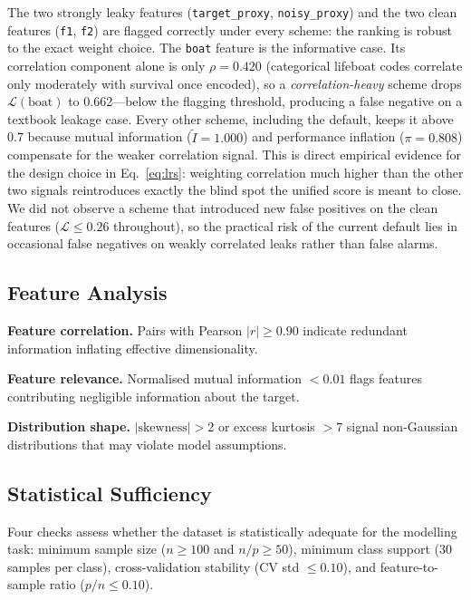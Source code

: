 \documentclass[11pt]{article}
\begin{document}
The two strongly leaky features (\texttt{target\_proxy}, \texttt{noisy\_proxy})
and the two clean features (\texttt{f1}, \texttt{f2}) are flagged correctly
under every scheme: the ranking is robust to the exact weight choice.  The
\texttt{boat} feature is the informative case.  Its correlation component
alone is only $\rho{=}0.420$ (categorical lifeboat codes correlate only
moderately with survival once encoded), so a \emph{correlation-heavy}
scheme drops $\mathcal{L}(\text{boat})$ to 0.662---below the flagging
threshold, producing a false negative on a textbook leakage case.  Every
other scheme, including the default, keeps it above 0.7 because mutual
information ($\widetilde I{=}1.000$) and performance inflation
($\pi{=}0.808$) compensate for the weaker correlation signal.  This is
direct empirical evidence for the design choice in
Eq.~\eqref{eq:lrs}: weighting correlation much higher than the other two
signals reintroduces exactly the blind spot the unified score is meant to
close.  We did not observe a scheme that introduced new false positives on
the clean features ($\mathcal{L}\le0.26$ throughout), so the practical risk
of the current default lies in occasional false negatives on weakly
correlated leaks rather than false alarms.

\subsection{Feature Analysis}

\textbf{Feature correlation.}  Pairs with Pearson $|r| \ge 0.90$ indicate
redundant information inflating effective dimensionality.

\textbf{Feature relevance.}  Normalised mutual information $< 0.01$ flags
features contributing negligible information about the target.

\textbf{Distribution shape.}  $|\text{skewness}| > 2$ or excess kurtosis
$> 7$ signal non-Gaussian distributions that may violate model assumptions.

\subsection{Statistical Sufficiency}

Four checks assess whether the dataset is statistically adequate for the
modelling task: minimum sample size ($n \ge 100$ and $n/p \ge 50$), minimum
class support (30 samples per class), cross-validation stability (CV std
$\le 0.10$), and feature-to-sample ratio ($p/n \le 0.10$).
\end{document}
